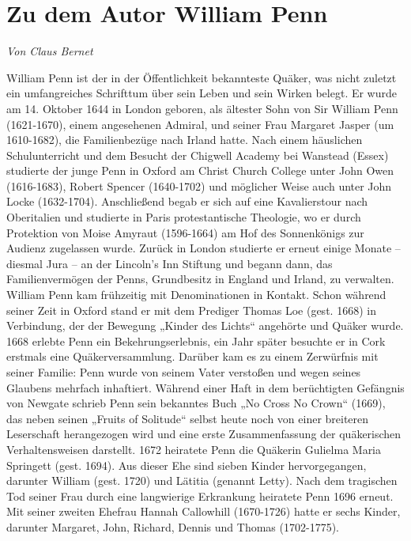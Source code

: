 \chapter{Zu dem Autor William Penn} \label{ref:zum_autor_penn}

\begin{flushright}
\begin{footnotesize}
\textit{Von Claus Bernet}
\end{footnotesize}
\end{flushright}
\smallskip 

William Penn ist der in der Öffentlichkeit bekannteste Quäker, was nicht zuletzt ein umfangreiches Schrifttum über sein Leben und sein Wirken belegt.  Er wurde am 14. Oktober 1644 in London geboren, als ältester Sohn von Sir William Penn (1621-1670), einem angesehenen Admiral, und seiner Frau Margaret Jasper (um 1610-1682), die Familienbezüge nach Irland hatte. Nach einem häuslichen Schulunterricht und dem Besucht der Chigwell Academy bei Wanstead (Essex) studierte der junge Penn in Oxford am Christ Church College unter John Owen (1616-1683), Robert Spencer (1640-1702) und möglicher Weise auch unter John Locke (1632-1704). Anschließend begab er sich auf eine Kavalierstour nach Oberitalien und studierte in Paris protestantische Theologie, wo er durch Protektion von Moise Amyraut (1596-1664) am Hof des Sonnenkönigs zur Audienz zugelassen wurde. Zurück in London studierte er erneut einige Monate – diesmal Jura – an der Lincoln’s Inn Stiftung und begann dann, das Familienvermögen der Penns, Grundbesitz in England und Irland, zu verwalten.
William Penn kam frühzeitig mit Denominationen in Kontakt. Schon während seiner Zeit in Oxford stand er mit dem Prediger Thomas Loe (gest. 1668) in Verbindung, der der Bewegung „Kinder des Lichts“ angehörte und Quäker wurde. 1668 erlebte Penn ein Bekehrungserlebnis, ein Jahr später besuchte er in Cork erstmals eine Quäkerversammlung. Darüber kam es zu einem Zerwürfnis mit seiner Familie: Penn wurde von seinem Vater verstoßen und wegen seines Glaubens mehrfach inhaftiert. Während einer Haft in dem berüchtigten Gefängnis von Newgate schrieb Penn sein bekanntes Buch „No Cross No Crown“ (1669), das neben seinen „Fruits of Solitude“ selbst heute noch von einer breiteren Leserschaft herangezogen wird und eine erste Zusammenfassung der quäkerischen Verhaltensweisen darstellt.
1672 heiratete Penn die Quäkerin Gulielma Maria Springett (gest. 1694). Aus dieser Ehe sind sieben Kinder hervorgegangen, darunter William (gest. 1720) und Lätitia (genannt Letty). Nach dem tragischen Tod seiner Frau durch eine langwierige Erkrankung heiratete Penn 1696 erneut. Mit seiner zweiten Ehefrau Hannah Callowhill (1670-1726) hatte er sechs Kinder, darunter Margaret, John, Richard, Dennis und Thomas (1702-1775).

